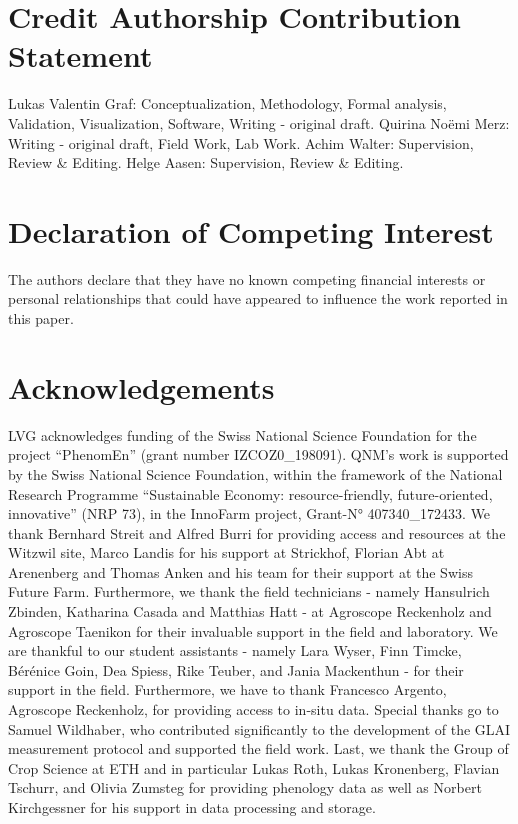 \section*{Credit Authorship Contribution Statement}
Lukas Valentin Graf: Conceptualization, Methodology, Formal analysis, Validation, Visualization, Software, Writing - original draft. Quirina Noëmi Merz: Writing - original draft, Field Work, Lab Work. Achim Walter: Supervision, Review \& Editing. Helge Aasen:  Supervision, Review \& Editing.

\section*{Declaration of Competing Interest}

The authors declare that they have no known competing financial interests or personal relationships that could have appeared to influence the work reported in this paper.

\section*{Acknowledgements}
LVG acknowledges funding of the Swiss National Science Foundation for the project “PhenomEn” (grant number IZCOZ0\_198091). QNM's work is supported by the Swiss National Science Foundation, within the framework of the National Research Programme “Sustainable Economy: resource-friendly, future-oriented, innovative” (NRP 73), in the InnoFarm project, Grant-N° 407340\_172433. We thank Bernhard Streit and Alfred Burri for providing access and resources at the Witzwil site, Marco Landis for his support at Strickhof, Florian Abt at Arenenberg and Thomas Anken and his team for their support at the Swiss Future Farm. Furthermore, we thank the field technicians - namely Hansulrich Zbinden, Katharina Casada and Matthias Hatt - at Agroscope Reckenholz and Agroscope Taenikon for their invaluable support in the field and laboratory. We are thankful to our student assistants - namely Lara Wyser, Finn Timcke, Bérénice Goin, Dea Spiess, Rike Teuber, and Jania Mackenthun - for their support in the field. Furthermore, we have to thank Francesco Argento, Agroscope Reckenholz, for providing access to in-situ data. Special thanks go to Samuel Wildhaber, who contributed significantly to the development of the \gls{GLAI} measurement protocol and supported the field work. Last, we thank the Group of Crop Science at ETH and in particular Lukas Roth, Lukas Kronenberg, Flavian Tschurr, and Olivia Zumsteg for providing phenology data as well as Norbert Kirchgessner for his support in data processing and storage.